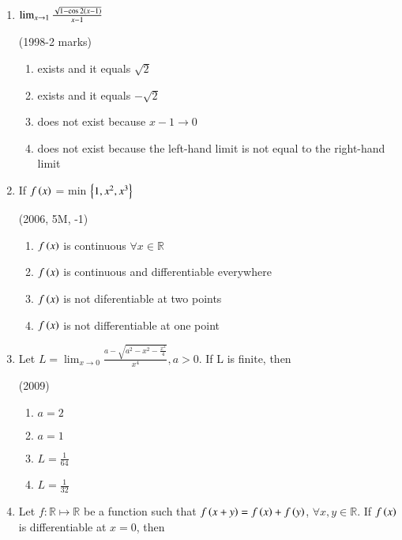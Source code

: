 \documentclass[journal]{IEEEtran}
\numberwithin{equation}{enumi}
\numberwithin{figure}{enumi}
\begin{document}
\begin{enumerate}
    \item 
    $\lim_{x \to1}\frac{\sqrt{1-\cos 2\left(x-1\right)}}{x-1}$ 

    \hfill(1998-2 marks)
    
    \begin{enumerate}
        \item exists and it equals $\sqrt{2}$
        \item exists and it equals $-\sqrt{2}$
        \item does not exist because $x-1\to 0$
        \item does not exist because the left-hand limit is not equal to the right-hand limit
    \end{enumerate}


    \item 
    If $f\left(x\right)$ = min $\left\{1,x^2,x^3\right\}$ 

    \hfill(2006, 5M, -1)
    
    \begin{enumerate}
        \item $f\left(x\right)$ is continuous $\forall x \in \mathbb{R}$
        \item $f\left(x\right)$ is continuous and differentiable everywhere
        \item $f\left(x\right)$ is not diferentiable at two points
        \item $f\left(x\right)$ is not differentiable at one point
    \end{enumerate}

    \item 
    Let $L=\lim_{x \to0}\frac{a-\sqrt{a^2-x^2-\frac{x^2}{4}}}{x^4}, a>0$. If L is finite, then 

    \hfill(2009)
    
    \begin{multicols}{4}
    \begin{enumerate}
        \item $a=2$ 
        \item $a=1$
        \item $L=\frac{1}{64}$
        \item $L=\frac{1}{32}$
    \end{enumerate}
    \end{multicols}	    


    \item 
    Let $f:\mathbb{R} \mapsto \mathbb{R}$ be a function such that $f\left(x+y\right)=f\left(x\right)+f\left(y\right)$, $\forall x,y\in \mathbb{R}$. If $f\left(x\right)$ is differentiable at $x=0$, then 


\end{enumerate}
\end{document}
